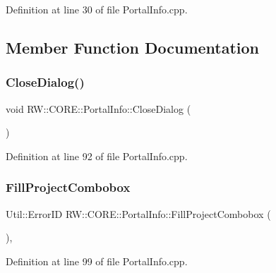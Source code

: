 Definition at line 30 of file Portal\+Info.\+cpp.



\subsection{Member Function Documentation}
\hypertarget{class_r_w_1_1_c_o_r_e_1_1_portal_info_a4ecfa598aff3ba559d65dcb8a78f3715}{}\label{class_r_w_1_1_c_o_r_e_1_1_portal_info_a4ecfa598aff3ba559d65dcb8a78f3715} 
\subsubsection{\texorpdfstring{Close\+Dialog()}{CloseDialog()}}
{\footnotesize\ttfamily void R\+W\+::\+C\+O\+R\+E\+::\+Portal\+Info\+::\+Close\+Dialog (\begin{DoxyParamCaption}{ }\end{DoxyParamCaption})\hspace{0.3cm}{\ttfamily [private]}}



Definition at line 92 of file Portal\+Info.\+cpp.

\hypertarget{class_r_w_1_1_c_o_r_e_1_1_portal_info_af67bdf39beece4b3fb27c9f1a14ecbd7}{}\label{class_r_w_1_1_c_o_r_e_1_1_portal_info_af67bdf39beece4b3fb27c9f1a14ecbd7} 
\subsubsection{\texorpdfstring{Fill\+Project\+Combobox}{FillProjectCombobox}}
{\footnotesize\ttfamily Util\+::\+Error\+ID R\+W\+::\+C\+O\+R\+E\+::\+Portal\+Info\+::\+Fill\+Project\+Combobox (\begin{DoxyParamCaption}{ }\end{DoxyParamCaption})\hspace{0.3cm}{\ttfamily [private]}, {\ttfamily [slot]}}



Definition at line 99 of file Portal\+Info.\+cpp.

